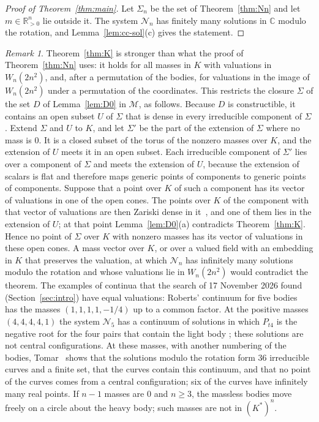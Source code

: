 \documentclass[11pt]{amsart}
\theoremstyle{definition}
\theoremstyle{remark}
\newtheorem{remark}[theorem]{Remark}
\numberwithin{equation}{section}
\newcommand{\CC}{\mathbb{C}}
\newcommand{\RR}{\mathbb{R}}
\newcommand{\cN}{\mathcal{N}}
\newcommand{\cM}{\mathcal{M}}
\begin{document}
\begin{proof}[Proof of Theorem~\ref{thm:main}]
Let $\Sigma_n$ be the set of Theorem~\ref{thm:Nn} and let $m \in \RR_{>0}^n$ lie outside it. The system
$\cN_n$ has finitely many solutions in $\CC$ modulo the rotation, and Lemma~\ref{lem:cc-sol}(c) gives the
statement.
\end{proof}

\begin{remark}\label{rem:roberts}
Theorem~\ref{thm:K} is stronger than what the proof of Theorem~\ref{thm:Nn} uses: it holds for all masses
in $K$ with valuations in $W_n(2n^2)$, and, after a permutation of the bodies, for valuations in the
image of $W_n(2n^2)$ under a permutation of the coordinates. This restricts the closure $\Sigma$ of the
set $D$ of Lemma~\ref{lem:D0} in $\cM$, as follows. Because $D$ is constructible, it contains an open
subset $U$ of $\Sigma$ that is dense in every irreducible component of $\Sigma$. Extend $\Sigma$ and
$U$ to $K$, and let $\Sigma'$ be the part of the extension of $\Sigma$ where no mass is $0$. It is a
closed subset of the torus of the nonzero masses over $K$, and the extension of $U$ meets it in an open
subset. Each irreducible component of $\Sigma'$ lies over a component of $\Sigma$ and meets the
extension of $U$, because the
extension of scalars is flat and therefore maps generic points of components to generic points of
components. Suppose that a
point over $K$ of such a component has its vector of valuations in one of the open cones. The points
over $K$ of the component with that vector of valuations are then Zariski dense in
it~\cite[Corollary~4.2, and Remark~2 of the erratum]{payne2009}, and one of them lies in the extension
of $U$; at that point Lemma~\ref{lem:D0}(a) contradicts Theorem~\ref{thm:K}. Hence no point of $\Sigma$
over $K$ with nonzero masses has its vector of valuations in these open cones. A mass vector over $K$, or
over a valued field with an embedding in $K$ that preserves the valuation, at which $\cN_n$ has infinitely
many solutions modulo the rotation and whose valuations lie in $W_n(2n^2)$ would contradict the theorem.
The examples of continua that the search of 17 November 2026 found (Section~\ref{sec:intro}) have
equal valuations: Roberts' continuum for five
bodies~\cite{roberts1999} has the masses $(1, 1, 1, 1, -1/4)$ up to a common factor. At the positive
masses $(4, 4, 4, 4, 1)$ the system $\cN_5$ has a continuum of solutions in which $P_{t4}$ is the
negative root for the four pairs that contain the light body
\cite[p.~543 and Remark~8]{albouykaloshin2012}; these solutions are not central configurations. At
these masses, with another numbering of the bodies, Tomar~\cite[Theorem~1.1 and
Proposition~3.2]{tomarspecial} shows that the solutions modulo the rotation form $36$ irreducible
curves and a finite set, that the curves contain this continuum, and that no point of the curves comes
from a central configuration; six of the curves have infinitely many real points. If $n - 1$ masses are $0$ and $n \ge 3$, the
massless bodies move freely on a circle about the heavy body; such masses are not in $(K^{*})^n$.
\end{remark}
\end{document}
